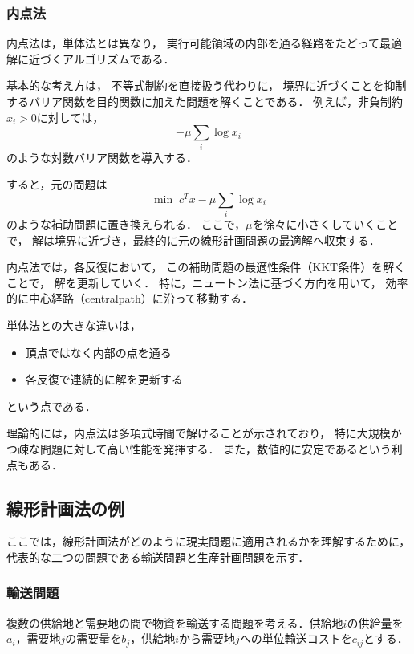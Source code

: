 \subsubsection{内点法}

内点法は，単体法とは異なり，
実行可能領域の内部を通る経路をたどって最適解に近づくアルゴリズムである．

基本的な考え方は，
不等式制約を直接扱う代わりに，
境界に近づくことを抑制するバリア関数を目的関数に加えた問題を解くことである．
例えば，非負制約$x_i>0$に対しては，
\begin{equation}
-\mu\sum_i\log x_i
\end{equation}
のような対数バリア関数を導入する．

すると，元の問題は
\begin{equation}
\min \;c^Tx-\mu\sum_i\log x_i
\end{equation}
のような補助問題に置き換えられる．
ここで，$\mu$を徐々に小さくしていくことで，
解は境界に近づき，最終的に元の線形計画問題の最適解へ収束する．

内点法では，各反復において，
この補助問題の最適性条件（KKT条件）を解くことで，
解を更新していく．
特に，ニュートン法に基づく方向を用いて，
効率的に中心経路（centralpath）に沿って移動する．

単体法との大きな違いは，
\begin{itemize}
\item 頂点ではなく内部の点を通る
\item 各反復で連続的に解を更新する
\end{itemize}
という点である．

理論的には，内点法は多項式時間で解けることが示されており，
特に大規模かつ疎な問題に対して高い性能を発揮する．
また，数値的に安定であるという利点もある．



\subsection{線形計画法の例}

ここでは，線形計画法がどのように現実問題に適用されるかを理解するために，代表的な二つの問題である輸送問題と生産計画問題を示す．

\subsubsection{輸送問題}

複数の供給地と需要地の間で物資を輸送する問題を考える\cite{hitchcock}．供給地$i$の供給量を$a_i$，需要地$j$の需要量を$b_j$，供給地$i$から需要地$j$への単位輸送コストを$c_{ij}$とする．

